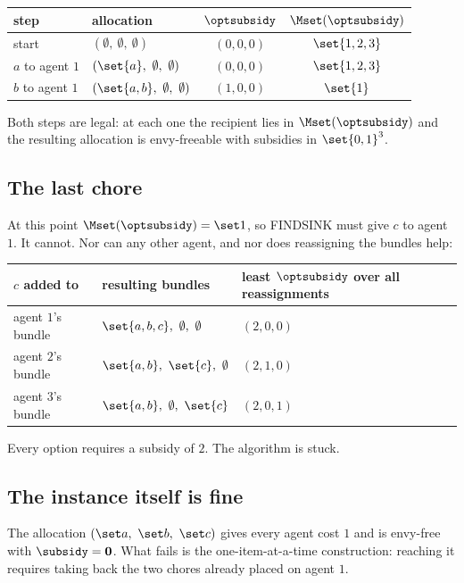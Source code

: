 \begin{center}
\begin{tabular}{llcc}
step & allocation & $\optsubsidy$ & $\Mset(\optsubsidy)$ \\
\hline
start & $(\emptyset,\ \emptyset,\ \emptyset)$ & $(0,0,0)$ & $\set{1,2,3}$ \\
$a$ to agent $1$ & $(\set{a},\ \emptyset,\ \emptyset)$ & $(0,0,0)$ & $\set{1,2,3}$ \\
$b$ to agent $1$ & $(\set{a,b},\ \emptyset,\ \emptyset)$ & $(1,0,0)$ & $\set{1}$ \\
\end{tabular}
\end{center}

Both steps are legal: at each one the recipient lies in $\Mset(\optsubsidy)$
and the resulting allocation is envy-freeable with subsidies in $\set{0,1}^3$.

\subsection{The last chore}

At this point $\Mset(\optsubsidy) = \set 1$, so FINDSINK must give $c$ to agent
$1$. It cannot. Nor can any other agent, and nor does reassigning the bundles
help:

\begin{center}
\begin{tabular}{lll}
$c$ added to & resulting bundles & least $\optsubsidy$ over all reassignments \\
\hline
agent $1$'s bundle & $\set{a,b,c},\ \emptyset,\ \emptyset$ & $(2,0,0)$ \\
agent $2$'s bundle & $\set{a,b},\ \set{c},\ \emptyset$ & $(2,1,0)$ \\
agent $3$'s bundle & $\set{a,b},\ \emptyset,\ \set{c}$ & $(2,0,1)$ \\
\end{tabular}
\end{center}

Every option requires a subsidy of $2$. The algorithm is stuck.

\subsection{The instance itself is fine}

The allocation $(\set a,\ \set b,\ \set c)$ gives every agent cost $1$ and is
envy-free with $\subsidy = \mathbf 0$. What fails is the one-item-at-a-time
construction: reaching it requires taking back the two chores already placed on
agent $1$.
